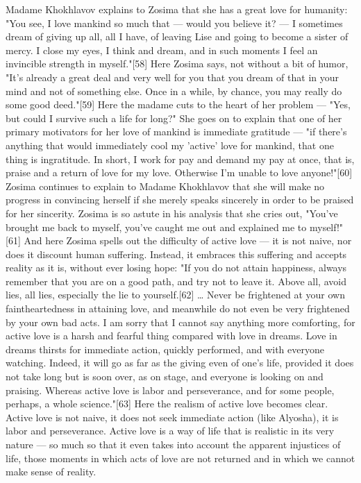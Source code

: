 Madame Khokhlavov explains to Zosima that she has a great love for humanity: "You see, I love mankind so much that — would you believe it? — I sometimes dream of giving up all, all I have, of leaving Lise and going to become a sister of mercy. I close my eyes, I think and dream, and in such moments I feel an invincible strength in myself."[58] Here Zosima says, not without a bit of humor, "It's already a great deal and very well for you that you dream of that in your mind and not of something else. Once in a while, by chance, you may really do some good deed."[59]
Here the madame cuts to the heart of her problem — "Yes, but could I survive such a life for long?" She goes on to explain that one of her primary motivators for her love of mankind is immediate gratitude — "if there's anything that would immediately cool my 'active' love for mankind, that one thing is ingratitude. In short, I work for pay and demand my pay at once, that is, praise and a return of love for my love. Otherwise I'm unable to love anyone!"[60] Zosima continues to explain to Madame Khokhlavov that she will make no progress in convincing herself if she merely speaks sincerely in order to be praised for her sincerity. Zosima is so astute in his analysis that she cries out, "You've brought me back to myself, you've caught me out and explained me to myself!"[61]
And here Zosima spells out the difficulty of active love — it is not naive, nor does it discount human suffering. Instead, it embraces this suffering and accepts reality as it is, without ever losing hope: 
"If you do not attain happiness, always remember that you are on a good path, and try not to leave it. Above all, avoid lies, all lies, especially the lie to yourself.[62] … Never be frightened at your own faintheartedness in attaining love, and meanwhile do not even be very frightened by your own bad acts. I am sorry that I cannot say anything more comforting, for active love is a harsh and fearful thing compared with love in dreams. Love in dreams thirsts for immediate action, quickly performed, and with everyone watching. Indeed, it will go as far as the giving even of one's life, provided it does not take long but is soon over, as on stage, and everyone is looking on and praising. Whereas active love is labor and perseverance, and for some people, perhaps, a whole science."[63] 
Here the realism of active love becomes clear. Active love is not naive, it does not seek immediate action (like Alyosha), it is labor and perseverance. Active love is a way of life that is realistic in its very nature — so much so that it even takes into account the apparent injustices of life, those moments in which acts of love are not returned and in which we cannot make sense of reality. 
